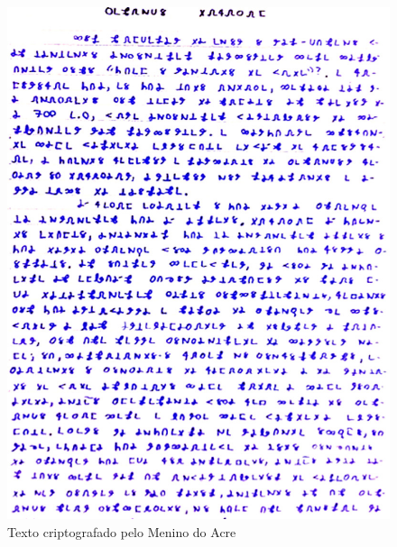 \begin{figure}[htbp]
  \centering
  \includegraphics[width=.8\textwidth]{imagens/bruno.jpg}
  \caption{Texto criptografado pelo Menino do Acre}
  \label{fig:menino-do-acre}
\end{figure}
